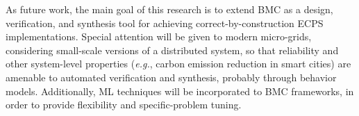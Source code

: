 \documentclass[format=acmsmall, review=false, screen=true]{acmart}
\begin{document}
{{As future work, the main goal of this research is to extend BMC as a design, verification, and synthesis tool for achieving correct-by-construction ECPS implementations. Special attention will be given to modern micro-grids, considering small-scale versions of a distributed system, so that reliability and other system-level properties ({\it e.g.}, carbon emission reduction in smart cities) are amenable to automated verification and synthesis, probably through behavior models. Additionally, ML techniques will be incorporated to BMC frameworks, in order to provide flexibility and specific-problem tuning.












}}
\end{document}
